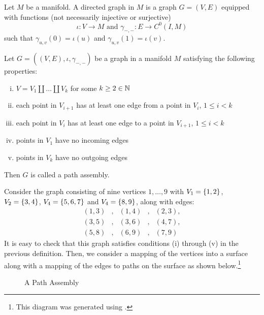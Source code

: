 \documentclass[./Thick_TQFTs_and_Quantum_Information.tex]{subfiles}
\begin{document}
\begin{defn}
Let $M$ be a manifold. A directed graph in $M$ is a graph $G = (V, E)$ equipped
with functions (not necessarily injective or surjective)
\[
  \iota : V \to M \text{ and } \gamma_{-, -} : E \to C^0(I, M)
\]
such that $\gamma_{u, v}(0) = \iota(u)$ and $\gamma_{u, v}(1) = \iota(v)$.
\end{defn}
\begin{defn}
Let $G = ((V, E), \iota, \gamma_{-, -})$ be a graph in a manifold $M$ satisfying
the following properties:
\begin{enumerate}[(i)]
\setlength{\itemsep}{0pt}
\item $V = V_1 \amalg \dots \amalg V_k$ for some $k \geq 2 \in \mathbb{N}$
\item each point in $V_{i + 1}$ has at least one edge from a point in $V_{i}$,
$1 \leq i < k$
\item each point in $V_{i}$ has at least one edge to a point in $V_{i + 1}$,
$1 \leq i < k$
\item points in $V_1$ have no incoming edges
\item points in $V_k$ have no outgoing edges
\end{enumerate}
Then $G$ is called a path assembly.
\end{defn}

\begin{exm}
Consider the graph consisting of nine vertices $1, \dots, 9$ with
$V_1 = \set{1, 2}$, $V_2 = \set{3, 4}$, $V_4 = \set{5, 6, 7}$ and
$V_4 = \set{8, 9}$, along with edges:
\[\begin{array}{ccccc}
  (1, 3) &,& (1, 4) &,& (2, 3),\\
  (3, 5) &,& (3, 6) &,& (4, 7),\\
  (5, 8) &,& (6, 9) &,& (7, 9)
\end{array}\]
It is easy to check that this graph satisfies conditions (i) through (v) in the
previous definition. Then, we consider a mapping of the vertices into a surface
along with a mapping of the edges to paths on the surface as shown
below.\footnote{This diagram was generated using \cite{Mathcha}.}
\begin{figure}[H]
\begin{center}

\end{center}
\caption{A Path Assembly}
\end{figure}
\end{exm}
\end{document}
